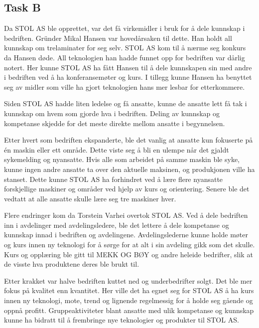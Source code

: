 \subsection{Task B}
Da STOL AS ble opprettet, var det få virkemidler i bruk for å dele kunnskap i bedriften. 
Gründer Mikal Hansen var hovedårsaken til dette.
Han holdt all kunnskap om trelaminater for seg selv. STOL AS kom til å nærme seg konkurs da Hansen døde.
All teknologien han hadde funnet opp for bedriften var dårlig notert.
Her kunne STOL AS ha fått Hansen til å dele kunnskapen sin med andre i bedriften ved å ha konferansemøter og kurs.
I tillegg kunne Hansen ha benyttet seg av midler som ville ha gjort teknologien hans mer lesbar for etterkommere.

Siden STOL AS hadde liten ledelse og få ansatte, kunne de ansatte lett få tak i kunnskap om hvem som gjorde hva i bedriften.
Deling av kunnskap og kompetanse skjedde for det meste direkte mellom ansatte i begynnelsen.

Etter hvert som bedriften ekspanderte, ble det vanlig at ansatte kun fokuserte på én maskin eller ett område.
Dette viste seg å bli en ulempe når det gjaldt sykemelding og nyansatte.
Hvis alle som arbeidet på samme maskin ble syke, kunne ingen andre ansatte ta over den aktuelle maksinen, og produkjonen ville ha stanset.
Dette kunne STOL AS ha forhindret ved å lære flere nyansatte forskjellige maskiner og områder ved hjelp av kurs og orientering.
Senere ble det vedtatt at alle ansatte skulle lære seg tre maskiner hver.

Flere endringer kom da Torstein Varhei overtok STOL AS.
Ved å dele bedriften inn i avdelinger med avdelingsledere, ble det lettere å dele kompetanse og kunnskap innad i bedriften og avdelingene.
Avdelingslederne kunne holde møter og kurs innen ny teknologi for å sørge for at alt i sin avdeling gikk som det skulle.
Kurs og opplæring ble gitt til MEKK OG BØY og andre heleide bedrifter, slik at de visste hva produktene deres ble brukt til.

Etter krakket var halve bedriften kuttet ned og underbedrifter solgt. Det ble mer fokus på kvalitet enn kvantitet.
Her ville det ha egnet seg for STOL AS å ha kurs innen ny teknologi, mote, trend og lignende regelmessig for å holde seg gående og oppnå profitt.
Gruppeaktiviteter blant ansatte med ulik kompetanse og kunnskap kunne ha bidratt til å frembringe nye teknologier og produkter til STOL AS.
